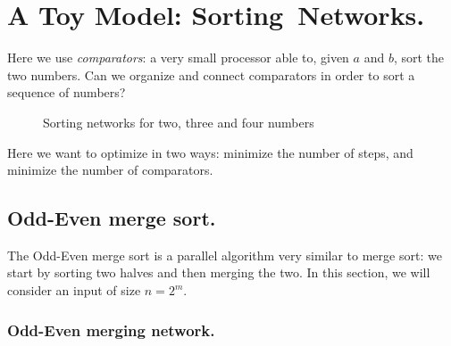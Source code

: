 \documentclass[./main]{subfiles}
\begin{document}
  \chapter{A Toy Model: Sorting~Networks.}

  Here we use \textit{comparators}: a very small processor able to, given $a$ and $b$, sort the two numbers.
  Can we organize and connect comparators in order to sort a sequence of numbers?

  \begin{figure}[H]
    \centering
    \quad\quad\quad
    \caption{Sorting networks for two, three and four numbers}
  \end{figure}

  Here we want to optimize in two ways: minimize the number of steps, and minimize the number of comparators.

  \section{Odd-Even merge sort.}

  The Odd-Even merge sort is a parallel algorithm very similar to merge sort: we start by sorting two halves and then merging the two.
  In this section, we will consider an input of size $n = 2^m$.

  \subsection{Odd-Even merging network.}
\end{document}
